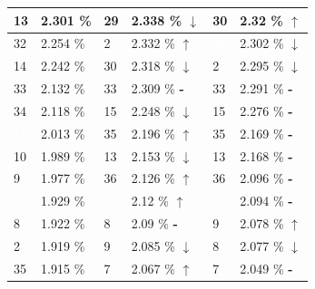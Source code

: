 \documentclass[letterpaper]{article}
\newcommand{\caseUp}[1][]{#1\textcolor[HTML]{008000}{$\mathbf{\uparrow}$}}
\newcommand{\caseStable}[1][]{#1\textcolor[HTML]{3779dd}{\textbf{-}}}
\newcommand{\caseDown}[1][]{#1\textcolor[HTML]{dd3737}{$\mathbf{\downarrow}$}}
\begin{document}
\begin{table}
\begin{tabular}{|l|l||l|l||l|l|}
	  \cellcolor[HTML]{FFFFF0} 13 & 2.301 \% & \cellcolor[HTML]{FFFFF0} 29 & 2.338 \% \caseDown[\hfill] & \cellcolor[HTML]{FFD700} 30 & 2.32 \% \caseUp[\hfill] \\ \hline
	  \cellcolor[HTML]{2E8B57} 32 & 2.254 \% & \cellcolor[HTML]{A0522D} 2 & 2.332 \% \caseUp[\hfill] & \cellcolor[HTML]{483D8B} \textcolor{white}{40} & 2.302 \% \caseDown[\hfill] \\ \hline
	  \cellcolor[HTML]{FF69B4} 14 & 2.242 \% & \cellcolor[HTML]{FFD700} 30 & 2.318 \% \caseDown[\hfill] & \cellcolor[HTML]{A0522D} 2 & 2.295 \% \caseDown[\hfill] \\ \hline
	  \cellcolor[HTML]{2E8B57} 33 & 2.132 \% & \cellcolor[HTML]{2E8B57} 33 & 2.309 \% \caseStable[\hfill] & \cellcolor[HTML]{2E8B57} 33 & 2.291 \% \caseStable[\hfill] \\ \hline
	  \cellcolor[HTML]{EEEED1} 34 & 2.118 \% & \cellcolor[HTML]{FF69B4} 15 & 2.248 \% \caseDown[\hfill] & \cellcolor[HTML]{FF69B4} 15 & 2.276 \% \caseStable[\hfill] \\ \hline
	  \cellcolor[HTML]{000000} \textcolor{white}{11} & 2.013 \% & \cellcolor[HTML]{2E8B57} 35 & 2.196 \% \caseUp[\hfill] & \cellcolor[HTML]{2E8B57} 35 & 2.169 \% \caseStable[\hfill] \\ \hline
	  \cellcolor[HTML]{1E90FF} 10 & 1.989 \% & \cellcolor[HTML]{FFFFF0} 13 & 2.153 \% \caseDown[\hfill] & \cellcolor[HTML]{FFFFF0} 13 & 2.168 \% \caseStable[\hfill] \\ \hline
	  \cellcolor[HTML]{1E90FF} 9 & 1.977 \% & \cellcolor[HTML]{E6E6FA} 36 & 2.126 \% \caseUp[\hfill] & \cellcolor[HTML]{E6E6FA} 36 & 2.096 \% \caseStable[\hfill] \\ \hline
	  \cellcolor[HTML]{483D8B} \textcolor{white}{40} & 1.929 \% & \cellcolor[HTML]{8B1A1A} \textcolor{white}{5} & 2.12 \% \caseUp[\hfill] & \cellcolor[HTML]{8B1A1A} \textcolor{white}{5} & 2.094 \% \caseStable[\hfill] \\ \hline
	  \cellcolor[HTML]{FFC1C1} 8 & 1.922 \% & \cellcolor[HTML]{FFC1C1} 8 & 2.09 \% \caseStable[\hfill] & \cellcolor[HTML]{1E90FF} 9 & 2.078 \% \caseUp[\hfill] \\ \hline
	  \cellcolor[HTML]{A0522D} 2 & 1.919 \% & \cellcolor[HTML]{1E90FF} 9 & 2.085 \% \caseDown[\hfill] & \cellcolor[HTML]{FFC1C1} 8 & 2.077 \% \caseDown[\hfill] \\ \hline
	  \cellcolor[HTML]{2E8B57} 35 & 1.915 \% & \cellcolor[HTML]{1E90FF} 7 & 2.067 \% \caseUp[\hfill] & \cellcolor[HTML]{1E90FF} 7 & 2.049 \% \caseStable[\hfill] \\ \hline

\end{tabular}
\end{table}
\end{document}
